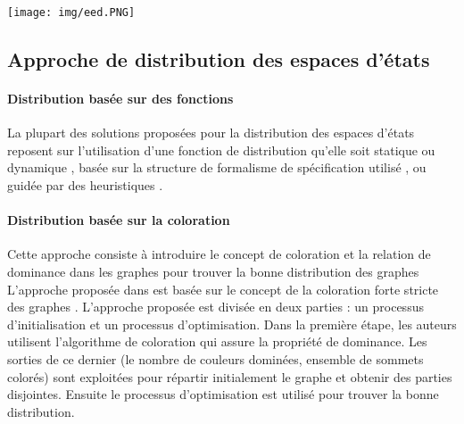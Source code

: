 \begin{center}
		\texttt{[image: img/eed.PNG]}		
		 \label{eed}
\end{center}

\subsection*{Approche de distribution des espaces d'états}
\paragraph{Distribution basée sur des fonctions}
 La plupart des solutions proposées pour la distribution des espaces d'états reposent sur l'utilisation d'une fonction de distribution qu'elle soit statique \citep{Garavel2013}ou dynamique \citep{Allmaier1997}, basée sur la structure de formalisme de spécification utilisé \citep{Ciardo1998}, \citep{BlomOrzan2005} ou guidée par des heuristiques \citep{Rodrigues2006}.
 \paragraph{Distribution basée sur la coloration}
 Cette approche consiste à introduire le concept de coloration et la relation de dominance dans les graphes pour trouver la bonne distribution des graphes L'approche proposée dans \citep{Guidoum2013} est basée sur le concept de la coloration forte stricte des graphes \citep{Bouzenada2012}. L'approche proposée est divisée en deux parties : un processus d'initialisation et un processus d'optimisation. Dans la première étape, les auteurs utilisent l'algorithme de coloration \citep{Bouzenada2012} qui assure la propriété de dominance. Les sorties de ce dernier (le nombre de couleurs dominées, ensemble de sommets colorés) sont exploitées pour répartir initialement le graphe et obtenir des parties disjointes. Ensuite le processus d'optimisation est utilisé pour trouver la bonne distribution.
 
